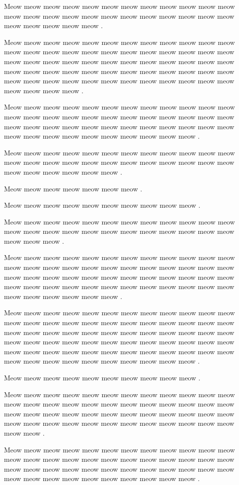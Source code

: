 \documentclass[12pt, a5paper, openany]{book}
\begin{document}
Meow meow meow meow meow meow meow meow meow meow meow meow meow meow meow meow meow meow meow meow meow meow meow meow meow meow meow meow meow .

Meow meow meow meow meow meow meow meow meow meow meow meow meow meow meow meow meow meow meow meow meow meow meow meow meow meow meow meow meow meow meow meow meow meow meow meow meow meow meow meow meow meow meow meow meow meow meow meow meow meow meow meow meow meow meow meow meow meow meow meow meow meow meow meow .

Meow meow meow meow meow meow meow meow meow meow meow meow meow meow meow meow meow meow meow meow meow meow meow meow meow meow meow meow meow meow meow meow meow meow meow meow meow meow meow meow meow meow meow meow meow meow .

Meow meow meow meow meow meow meow meow meow meow meow meow meow meow meow meow meow meow meow meow meow meow meow meow meow meow meow meow meow meow .

Meow meow meow meow meow meow meow .

Meow meow meow meow meow meow meow meow meow meow .

Meow meow meow meow meow meow meow meow meow meow meow meow meow meow meow meow meow meow meow meow meow meow meow meow meow meow meow .

Meow meow meow meow meow meow meow meow meow meow meow meow meow meow meow meow meow meow meow meow meow meow meow meow meow meow meow meow meow meow meow meow meow meow meow meow meow meow meow meow meow meow meow meow meow meow meow meow meow meow meow meow meow meow .

Meow meow meow meow meow meow meow meow meow meow meow meow meow meow meow meow meow meow meow meow meow meow meow meow meow meow meow meow meow meow meow meow meow meow meow meow meow meow meow meow meow meow meow meow meow meow meow meow meow meow meow meow meow meow meow meow meow meow meow meow meow meow meow meow meow meow meow meow meow meow .

Meow meow meow meow meow meow meow meow meow meow .

Meow meow meow meow meow meow meow meow meow meow meow meow meow meow meow meow meow meow meow meow meow meow meow meow meow meow meow meow meow meow meow meow meow meow meow meow meow meow meow meow meow meow meow meow meow meow meow meow meow meow .

Meow meow meow meow meow meow meow meow meow meow meow meow meow meow meow meow meow meow meow meow meow meow meow meow meow meow meow meow meow meow meow meow meow meow meow meow meow meow meow meow meow meow meow meow meow meow .
\end{document}
